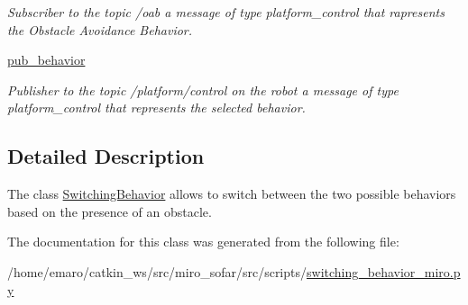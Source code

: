 \begin{DoxyCompactItemize}
\begin{DoxyCompactList}\small\item\em Subscriber to the topic /oab a message of type platform\+\_\+control that rapresents the Obstacle Avoidance Behavior. \end{DoxyCompactList}\item 
\mbox{\label{classswitching__behavior__miro_1_1SwitchingBehavior_a8cddaa9fb7106bd6724c4276c58c0cee}} 
\mbox{\hyperlink{classswitching__behavior__miro_1_1SwitchingBehavior_a8cddaa9fb7106bd6724c4276c58c0cee}{pub\+\_\+behavior}}
\begin{DoxyCompactList}\small\item\em Publisher to the topic /platform/control on the robot a message of type platform\+\_\+control that represents the selected behavior. \end{DoxyCompactList}\end{DoxyCompactItemize}


\subsection{Detailed Description}
The class \mbox{\hyperlink{classswitching__behavior__miro_1_1SwitchingBehavior}{Switching\+Behavior}} allows to switch between the two possible behaviors based on the presence of an obstacle. 

The documentation for this class was generated from the following file\+:\begin{DoxyCompactItemize}
\item 
/home/emaro/catkin\+\_\+ws/src/miro\+\_\+sofar/src/scripts/\mbox{\hyperlink{switching__behavior__miro_8py}{switching\+\_\+behavior\+\_\+miro.\+py}}\end{DoxyCompactItemize}
